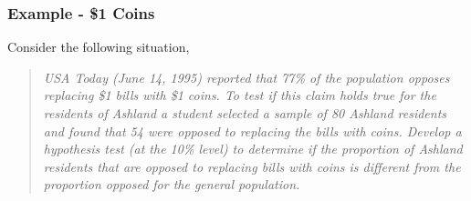 \documentclass[10pt,openany]{book}\usepackage[]{graphicx}\usepackage[]{color}
\begin{document}
\subsubsection{Example - \$1 Coins}
Consider the following situation,
\begin{quote}
\textsl{USA Today (June 14, 1995) reported that 77\% of the population opposes replacing \$1 bills with \$1 coins.  To test if this claim holds true for the residents of Ashland a student selected a sample of 80 Ashland residents and found that 54 were opposed to replacing the bills with coins.  Develop a hypothesis test (at the 10\% level) to determine if the proportion of Ashland residents that are opposed to replacing bills with coins is different from the proportion opposed for the general population.}
\end{quote}
\end{document}

